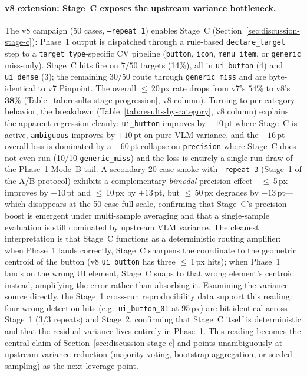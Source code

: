 \documentclass[sigconf,nonacm]{acmart}
\begin{document}
\paragraph{v8 extension: Stage~C exposes the upstream variance
  bottleneck.}
The v8 campaign (50 cases, \texttt{--repeat 1}) enables Stage~C
(Section~\ref{sec:discussion-stage-c}): Phase~1 output is dispatched
through a rule-based \texttt{declare\_target} step to a
\texttt{target\_type}-specific CV pipeline (\texttt{button},
\texttt{icon}, \texttt{menu\_item}, or \texttt{generic} miss-only).
Stage~C hits fire on $7/50$ targets (14\%), all in \texttt{ui\_button}
(4) and \texttt{ui\_dense} (3); the remaining $30/50$ route through
\texttt{generic\_miss} and are byte-identical to v7 Pinpoint.  The
overall $\leq$\,20\,px rate drops from v7's $54\%$ to v8's
$\mathbf{38\%}$ (Table~\ref{tab:results-stage-progression}, v8 column).
Turning to per-category behavior, the breakdown
(Table~\ref{tab:results-by-category}, v8 column) explains the
apparent regression cleanly: \texttt{ui\_button} improves by $+10$\,pt where
Stage~C is active, \texttt{ambiguous} improves by $+10$\,pt on pure
VLM variance, and the $-16$\,pt overall loss is dominated by a
$-60$\,pt collapse on \texttt{precision} where Stage~C does not even
run (10/10 \texttt{generic\_miss}) and the loss is entirely a
single-run draw of the Phase~1 Mode~B tail.  A secondary 20-case
smoke with \texttt{--repeat 3} (Stage~1 of the A/B protocol)
exhibits a complementary \emph{bimodal} precision effect---$\leq$\,5\,px
improves by $+10$\,pt and $\leq$\,10\,px by $+13$\,pt, but
$\leq$\,50\,px degrades by $-13$\,pt---which disappears at the 50-case
full scale, confirming that Stage~C's precision boost is emergent
under multi-sample averaging and that a single-sample evaluation is
still dominated by upstream VLM variance.  The cleanest
interpretation is that Stage~C functions as a deterministic routing
amplifier: when Phase~1 lands correctly, Stage~C sharpens the
coordinate to the geometric centroid of the button (v8
\texttt{ui\_button} has three $\leq$\,1\,px hits); when Phase~1 lands
on the wrong UI element, Stage~C snaps to that wrong element's
centroid instead, amplifying the error rather than absorbing it.
Examining the variance source directly, the Stage~1
cross-run reproducibility data support this reading: four
wrong-detection hits (e.g.\ \texttt{ui\_button\_01} at
$95$\,px) are bit-identical across Stage~1 ($3/3$ repeats) and
Stage~2, confirming that Stage~C itself is deterministic and that
the residual variance lives entirely in Phase~1.  This reading
becomes the central claim of Section~\ref{sec:discussion-stage-c}
and points unambiguously at upstream-variance reduction (majority
voting, bootstrap aggregation, or seeded sampling) as the next
leverage point.
\end{document}
